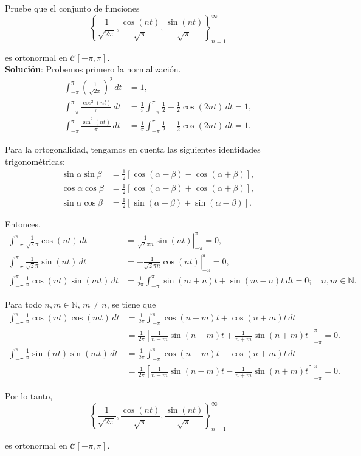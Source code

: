 \begin{ejemplo}
Pruebe que el conjunto de funciones 
$$\left\{ \frac{1}{\sqrt{2 \pi}}, \frac{\cos(nt)}{\sqrt{\pi}} ,  \frac{\sin(nt)}{\sqrt{\pi}} \right\}_{n=1}^{\infty}$$

es ortonormal en $\mathcal{C}[-\pi,\pi]$.
\\

\textbf{Solución}: Probemos primero la normalización.
\begin{align*}
    \int_{-\pi}^{\pi} \left( \frac{1}{\sqrt{2\pi}} \right)^2 \,dt &= 1, \\
    \int_{-\pi}^{\pi} \frac{\cos^2(nt)}{\pi} \,dt &=  \frac{1}{\pi} \int_{-\pi}^{\pi} \frac{1}{2} + \frac{1}{2} \cos(2n t) \,dt = 1, \\
    \int_{-\pi}^{\pi} \frac{\sin^2(nt)}{\pi} \,dt &=  \frac{1}{\pi} \int_{-\pi}^{\pi} \frac{1}{2} - \frac{1}{2} \cos(2n t) \,dt = 1.
\end{align*}

Para la ortogonalidad, tengamos en cuenta las siguientes identidades trigonométricas:
\begin{align*}
    \sin \alpha \sin \beta &= \frac{1}{2} [\cos(\alpha - \beta) - \cos(\alpha + \beta)], \\
    \cos \alpha \cos \beta &= \frac{1}{2} [\cos(\alpha - \beta) + \cos(\alpha + \beta)], \\
    \sin \alpha \cos \beta &= \frac{1}{2} [\sin(\alpha + \beta) + \sin(\alpha - \beta)].
\end{align*}

Entonces, 
\begin{align*}
    \int_{-\pi}^{\pi} \frac{1}{\sqrt{2} \pi} \cos(nt) \,dt &=  \left. \frac{1}{\sqrt{2}\pi n} \sin(nt) \right|_{-\pi}^{\pi} = 0, \\
     \int_{-\pi}^{\pi} \frac{1}{\sqrt{2} \pi} \sin(nt) \,dt &=   \left. - \frac{1}{\sqrt{2}\pi n} \cos(nt) \right|_{-\pi}^{\pi} = 0,\\
      \int_{-\pi}^{\pi} \frac{1}{\pi} \cos(n t) \sin(m t)\,dt &=  \frac{1}{2 \pi} \int_{-\pi}^{\pi} \sin(m+n)t + \sin(m-n)t \ dt = 0; \quad n,m \in \mathbb{N}. 
\end{align*}

Para todo $n, m \in \mathbb{N}$, $m \neq n$, se tiene que 
\begin{align*}
    \int_{-\pi}^{\pi} \frac{1}{\pi} \cos(n t) \cos(mt) \,dt &= \frac{1}{2\pi} \int_{-\pi}^{\pi} \cos(n-m)t + \cos(n+m) t\,dt \\
    &= \frac{1}{2\pi} \left[ \frac{1}{n-m} \sin(n-m)t + \frac{1}{n+m} \sin(n+m)t \right]_{-\pi}^{\pi} = 0. \\
     \int_{-\pi}^{\pi} \frac{1}{\pi} \sin(n t) \sin(mt) \,dt &=\frac{1}{2\pi} \int_{-\pi}^{\pi} \cos(n-m)t - \cos(n+m) t\,dt  \\
    &= \frac{1}{2\pi} \left[ \frac{1}{n-m} \sin(n-m)t - \frac{1}{n+m} \sin(n+m)t \right]_{-\pi}^{\pi} = 0.
\end{align*}

Por lo tanto, 
$$\left\{ \frac{1}{\sqrt{2 \pi}}, \frac{\cos(nt)}{\sqrt{\pi}} ,  \frac{\sin(nt)}{\sqrt{\pi}} \right\}_{n=1}^{\infty}$$

es ortonormal en $\mathcal{C}[-\pi,\pi]$.
\end{ejemplo}


